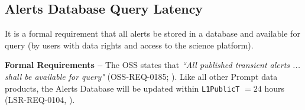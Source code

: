 \documentclass[DM,authoryear,toc]{lsstdoc}
\begin{document}
\subsection{Alerts Database Query Latency}

It is a formal requirement that all alerts be stored in a database and available for query (by users with data rights and access to the science platform).

{\bf Formal Requirements --} The OSS states that {\it ``All published transient alerts ... shall be available for query"} (OSS-REQ-0185; ). Like all other Prompt data products, the Alerts Database will be updated within {\tt L1PublicT} $=24$ hours (LSR-REQ-0104, ).


\clearpage


\end{document}
